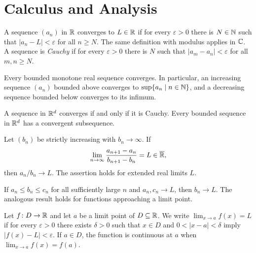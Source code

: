 \chapter{Calculus and Analysis}

\begin{definition}
A sequence $(a_n)$ in $\mathbb{R}$ converges to $L\in\mathbb{R}$ if for every $\varepsilon>0$ there is $N\in\mathbb{N}$ such that $|a_n-L|<\varepsilon$ for all $n\ge N$. The same definition with modulus applies in $\mathbb{C}$. A sequence is \emph{Cauchy} if for every $\varepsilon>0$ there is $N$ such that $|a_m-a_n|<\varepsilon$ for all $m,n\ge N$.
\end{definition}

\begin{theorem}
Every bounded monotone real sequence converges. In particular, an increasing sequence $(a_n)$ bounded above converges to $\sup\{a_n\mid n\in\mathbb{N}\}$, and a decreasing sequence bounded below converges to its infimum.
\end{theorem}

\begin{theorem}
A sequence in $\mathbb{R}^d$ converges if and only if it is Cauchy. Every bounded sequence in $\mathbb{R}^d$ has a convergent subsequence.
\end{theorem}

\begin{theorem}
Let $(b_n)$ be strictly increasing with $b_n\to\infty$. If
\[
 \lim_{n\to\infty}\frac{a_{n+1}-a_n}{b_{n+1}-b_n}=L\in\overline{\mathbb{R}},
\]
then $a_n/b_n\to L$. The assertion holds for extended real limits $L$.
\end{theorem}

\begin{theorem}
If $a_n\le b_n\le c_n$ for all sufficiently large $n$ and $a_n,c_n\to L$, then $b_n\to L$. The analogous result holds for functions approaching a limit point.
\end{theorem}

\begin{definition}
Let $f\colon D\to\mathbb{R}$ and let $a$ be a limit point of $D\subseteq\mathbb{R}$. We write $\lim_{x\to a}f(x)=L$ if for every $\varepsilon>0$ there exists $\delta>0$ such that $x\in D$ and $0<|x-a|<\delta$ imply $|f(x)-L|<\varepsilon$. If $a\in D$, the function is continuous at $a$ when $\lim_{x\to a}f(x)=f(a)$.
\end{definition}


